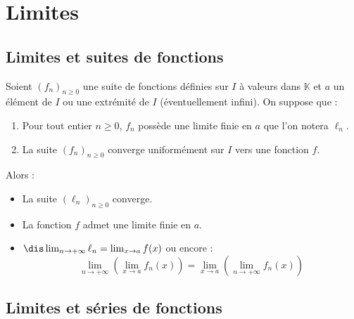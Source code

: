 \documentclass[a4paper,10pt]{report}
\begin{document}
\section{Limites}
\subsection{Limites et suites de fonctions}

\begin{thm}

\noindent Soient $(f_n)_{n \geq 0}$ une suite de fonctions définies sur $I$ à valeurs dans $\mathbb{K}$ et $a$ un élément de $I$ ou une extrémité de $I$ (éventuellement infini). On suppose que :

\begin{enumerate}
\item Pour tout entier $n \geq 0$, $f_n$ possède une limite finie en $a$ que l'on notera $\ell_n$.
\item La suite $(f_n)_{n \geq 0}$ converge uniformément sur $I$ vers une fonction $f$.
\end{enumerate}
Alors :

\begin{itemize}
\item La suite $(\ell_n)_{n \geq 0}$ converge.
\item La fonction $f$ admet une limite finie en $a$.
\item $\dis \lim_{n \rightarrow + \infty} \ell_n = \lim_{x \rightarrow a } f(x)$ ou encore :
$$ \lim_{n \rightarrow + \infty} \left( \lim_{x \rightarrow a} f_n(x) \right)=  \lim_{x \rightarrow a} \left(\lim_{n \rightarrow + \infty} f_n(x)\right)$$
\end{itemize}
\end{thm}

\subsection{Limites et séries de fonctions}
\end{document}
